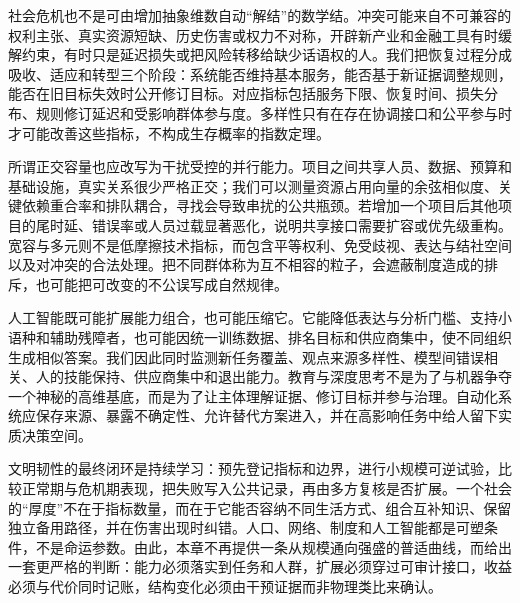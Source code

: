 社会危机也不是可由增加抽象维数自动“解结”的数学结。冲突可能来自不可兼容的权利主张、真实资源短缺、历史伤害或权力不对称，开辟新产业和金融工具有时缓解约束，有时只是延迟损失或把风险转移给缺少话语权的人。我们把恢复过程分成吸收、适应和转型三个阶段：系统能否维持基本服务，能否基于新证据调整规则，能否在旧目标失效时公开修订目标。对应指标包括服务下限、恢复时间、损失分布、规则修订延迟和受影响群体参与度。多样性只有在存在协调接口和公平参与时才可能改善这些指标，不构成生存概率的指数定理。

所谓正交容量也应改写为干扰受控的并行能力。项目之间共享人员、数据、预算和基础设施，真实关系很少严格正交；我们可以测量资源占用向量的余弦相似度、关键依赖重合率和排队耦合，寻找会导致串扰的公共瓶颈。若增加一个项目后其他项目的尾时延、错误率或人员过载显著恶化，说明共享接口需要扩容或优先级重构。宽容与多元则不是低摩擦技术指标，而包含平等权利、免受歧视、表达与结社空间以及对冲突的合法处理。把不同群体称为互不相容的粒子，会遮蔽制度造成的排斥，也可能把可改变的不公误写成自然规律。

人工智能既可能扩展能力组合，也可能压缩它。它能降低表达与分析门槛、支持小语种和辅助残障者，也可能因统一训练数据、排名目标和供应商集中，使不同组织生成相似答案。我们因此同时监测新任务覆盖、观点来源多样性、模型间错误相关、人的技能保持、供应商集中和退出能力。教育与深度思考不是为了与机器争夺一个神秘的高维基底，而是为了让主体理解证据、修订目标并参与治理。自动化系统应保存来源、暴露不确定性、允许替代方案进入，并在高影响任务中给人留下实质决策空间。

文明韧性的最终闭环是持续学习：预先登记指标和边界，进行小规模可逆试验，比较正常期与危机期表现，把失败写入公共记录，再由多方复核是否扩展。一个社会的“厚度”不在于指标数量，而在于它能否容纳不同生活方式、组合互补知识、保留独立备用路径，并在伤害出现时纠错。人口、网络、制度和人工智能都是可塑条件，不是命运参数。由此，本章不再提供一条从规模通向强盛的普适曲线，而给出一套更严格的判断：能力必须落实到任务和人群，扩展必须穿过可审计接口，收益必须与代价同时记账，结构变化必须由干预证据而非物理类比来确认。
